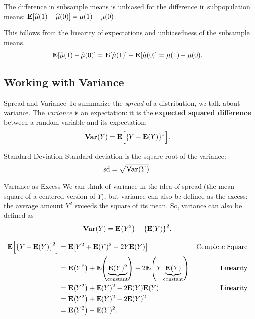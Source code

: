 \begin{clm}
	The difference in subsample means is unbiased for the difference in subpopulation means: $\vb{E}\qty[\widehat{\mu}(1)-\widehat{\mu}(0)]=\mu(1)-\mu(0)$.
\end{clm}
\begin{prf}
	This follows from the linearity of expectations and unbiasedness of the subsample means. \[\vb{E}\qty[\widehat\mu(1)-\widehat\mu(0)]=\vb{E}\qty[\widehat\mu(1)]-\vb{E}\qty[\widehat\mu(0)]=\mu(1)-\mu(0).\]
\end{prf}

\subsection{Working with Variance}
\begin{df}{Spread and Variance}
	To summarize the \textit{spread} of a distribution, we talk about variance. The \textit{variance}	is an expectation: it is the \textbf{expected squared difference} between a random variable and its expectation: \[\vb{Var}(Y)=\vb{E}\qty[\qty{Y-\vb{E}(Y)}^2].\]
\end{df}
\begin{df}{Standard Deviation}
	Standard deviation is the square root of the variance: \[\mathrm{sd}=\sqrt{\vb{Var}(Y)}.\]
\end{df}
\begin{thm}{Variance as Excess}
	We can think of variance in the idea of spread (the mean square of a centered version of $Y$), but variance can also be defined as the excess: the average amount $Y^2$ exceeds the square of its mean. So, variance can also be defined as \[\vb{Var}(Y)=\vb{E}\qty(Y^2)-\qty{\vb{E}(Y)}^2.\]
\end{thm}
\begin{prf}
	\begin{align*}
		\vb{E}\qty[\qty{Y-\vb{E}(Y)}^2]&=\vb{E}\qty[Y^2+\vb{E}(Y)^2-2Y\vb{E}(Y)]&\text{Complete Square}\\
		&=\vb{E}\qty(Y^2)+\vb{E}\qty(\underbrace{\vb{E}(Y)^2}_\text{constant})-2\vb{E}\qty(Y\underbrace{\vb{E}(Y)}_\text{constant})&\text{Linearity}\\
		&=\vb{E}\qty(Y^2)+\vb{E}(Y)^2-2\vb{E}(Y)\vb{E}(Y)&\text{Linearity}\\
		&=\vb{E}\qty(Y^2)+\vb{E}(Y)^2-2\vb{E}(Y)^2\\
		&=\vb{E}\qty(Y^2)-\vb{E}(Y)^2.
	\end{align*}	
\end{prf}
